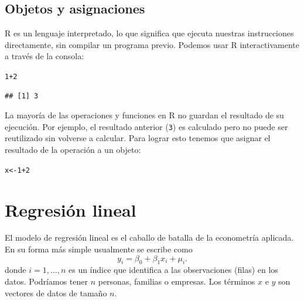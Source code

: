 \documentclass{article}\usepackage[]{graphicx}\usepackage[]{color}
\makeatletter
\newcommand{\hlnum}[1]{\textcolor[rgb]{0.686,0.059,0.569}{#1}}%
\newcommand{\hlopt}[1]{\textcolor[rgb]{0,0,0}{#1}}%
\newcommand{\hlstd}[1]{\textcolor[rgb]{0.345,0.345,0.345}{#1}}%
\newcommand{\hlkwb}[1]{\textcolor[rgb]{0.69,0.353,0.396}{#1}}%
\newenvironment{kframe}{%
 \def\at@end@of@kframe{}%
 \ifinner\ifhmode%
  \def\at@end@of@kframe{\end{minipage}}%
  \begin{minipage}{\columnwidth}%
 \fi\fi%
 \def\FrameCommand##1{\hskip\@totalleftmargin \hskip-\fboxsep
 \colorbox{shadecolor}{##1}\hskip-\fboxsep
     \hskip-\linewidth \hskip-\@totalleftmargin \hskip\columnwidth}%
 \MakeFramed {\advance\hsize-\width
   \@totalleftmargin\z@ \linewidth\hsize
   \@setminipage}}%
 {\par\unskip\endMakeFramed%
 \at@end@of@kframe}
\newenvironment{knitrout}{}{} %
\makeatother
\begin{document}
\subsection{Objetos y asignaciones}

R es un lenguaje interpretado, lo que significa que ejecuta nuestras instrucciones directamente, sin compilar un programa previo. Podemos usar R interactivamente a través de la consola:
\begin{knitrout}
\color{fgcolor}\begin{kframe}
\begin{alltt}
\hlnum{1}\hlopt{+}\hlnum{2}
\end{alltt}
\begin{verbatim}
## [1] 3
\end{verbatim}
\end{kframe}
\end{knitrout}

La mayoría de las operaciones y funciones en R no guardan el resultado de su ejecución. Por ejemplo, el resultado anterior (\verb|3|) es calculado pero no puede ser reutilizado sin volverse a calcular. Para lograr esto tenemos que asignar el resultado de la operación a un objeto:
\begin{knitrout}
\color{fgcolor}\begin{kframe}
\begin{alltt}
\hlstd{x} \hlkwb{<-} \hlnum{1}\hlopt{+}\hlnum{2}
\end{alltt}
\end{kframe}
\end{knitrout}



\section{Regresión lineal}



El modelo de regresión lineal es el caballo de batalla de la econometría aplicada.
En su forma más simple usualmente se escribe como
\begin{equation}
y_i = \beta_0 + \beta_1 x_i + \mu_i.
\label{eq:modelo_lineal_simple}
\end{equation}
donde $i = 1, \ldots, n$ es un índice que identifica a las observaciones (filas) en los datos. Podríamos tener $n$ personas, familias o empresas. Los términos $x$ e $y$ son vectores de datos de tamaño $n$.
\end{document}
